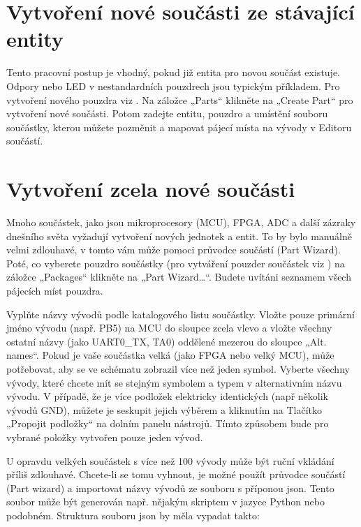 \documentclass[letterpaper,10pt,czech]{sphinxmanual}
\begin{document}
\section{Vytvoření nové součásti ze stávající entity}
\label{\detokenize{pool-mgr_cz:vytvoreni-nove-soucasti-ze-stavajici-entity}}
Tento pracovní postup je vhodný, pokud již entita pro novou součást
existuje. Odpory nebo LED v nestandardních pouzdrech jsou typickým příkladem. Pro vytvoření nového pouzdra viz {\hyperref[\detokenize{create-package_cz::doc}]{}}. Na záložce „Parts“ klikněte na „Create Part“ pro vytvoření nové součásti. Potom zadejte entitu, pouzdro a umístění souboru součástky, kterou můžete pozměnit a mapovat pájecí místa na vývody v Editoru součástí.


\section{Vytvoření zcela nové součásti}
\label{\detokenize{pool-mgr_cz:vytvoreni-zcela-nove-soucasti}}
Mnoho součástek, jako jsou mikroprocesory (MCU), FPGA, ADC a další zázraky dnešního světa
vyžadují vytvoření nových jednotek a entit. To by bylo manuálně velmi zdlouhavé, v tomto vám může pomoci průvodce součástí (Part Wizard). Poté, co vyberete pouzdro součástky (pro vytváření pouzder součástek viz {\hyperref[\detokenize{create-package_cz::doc}]{}}) na záložce „Packages“ klikněte na „Part Wizard…“. Budete uvítáni seznamem všech pájecích míst pouzdra.

Vyplňte názvy vývodů podle katalogového listu součástky. Vložte pouze primární jméno vývodu (např. PB5) na MCU do sloupce zcela vlevo a vložte všechny ostatní názvy (jako UART0\_TX, TA0) oddělené mezerou do sloupce „Alt. names“. Pokud je vaše součástka  velká (jako FPGA nebo velký MCU), může potřebovat, aby se ve schématu zobrazil více než jeden symbol. Vyberte všechny vývody, které chcete mít se stejným symbolem a typem v alternativním názvu vývodu. V případě, že je více podložek elektricky identických (např
několik vývodů GND), můžete je seskupit jejich výběrem a kliknutím na
Tlačítko „Propojit podložky“ na dolním panelu nástrojů. Tímto způsobem bude pro vybrané položky vytvořen pouze jeden vývod.

U opravdu velkých součástek s více než 100 vývody může být ruční vkládání příliš zdlouhavé. Chcete-li se tomu vyhnout, je možné použít průvodce součástí (Part wizard) a importovat názvy vývodů ze souboru s příponou json. Tento soubor může být generován např. nějakým skriptem v jazyce Python nebo podobném. Struktura souboru json by měla vypadat takto:
\end{document}

